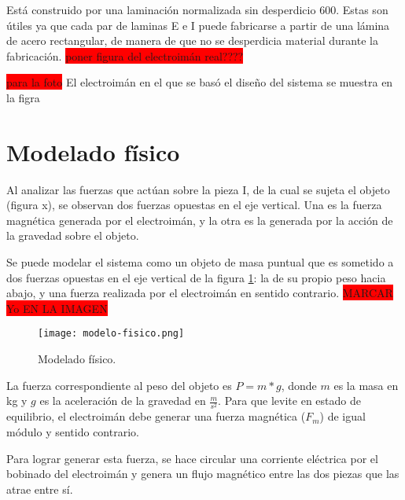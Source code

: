 \noindent Está construido por una laminación normalizada sin desperdicio 600. Estas son útiles ya que cada par de laminas E e I puede fabricarse a partir de una lámina de acero rectangular, de manera de que no se desperdicia material durante la fabricación. 
\colorbox{red}{poner figura del electroimán real????}

\noindent \colorbox{red}{para la foto} El electroimán en el que se basó el diseño del sistema se muestra en la figra

\section{Modelado físico}

\noindent Al analizar las fuerzas que actúan sobre la pieza I, de la cual se sujeta el objeto (figura x), se observan dos fuerzas opuestas en el eje vertical. Una es la fuerza magnética generada por el electroimán, y la otra es la generada por la acción de la gravedad sobre el objeto. 
 
\noindent Se puede modelar el sistema como un objeto de masa puntual que es sometido a dos fuerzas opuestas en el eje vertical de la figura \ref{fig:img_modelado-fisico}: la de su propio peso hacia abajo, y una fuerza realizada por el electroimán en sentido contrario. \colorbox{red}{MARCAR Yo EN LA IMAGEN}

\begin{figure}[H]
	\centering
	\texttt{[image: modelo-fisico.png]}
	\caption{Modelado físico.}
	\label{fig:img_modelado-fisico}
\end{figure}

\noindent La fuerza correspondiente al peso del objeto es $P=m*g$, donde $m$ es la masa en kg y $g$ es la aceleración de la gravedad en $\frac{m}{s^{2}}$. Para que levite en estado de equilibrio, el electroimán debe generar una fuerza magnética ($F_{m}$) de igual módulo y sentido contrario.

\noindent Para lograr generar esta fuerza, se hace circular una corriente eléctrica por el bobinado del electroimán y genera un flujo magnético entre las dos piezas que las atrae entre sí.

